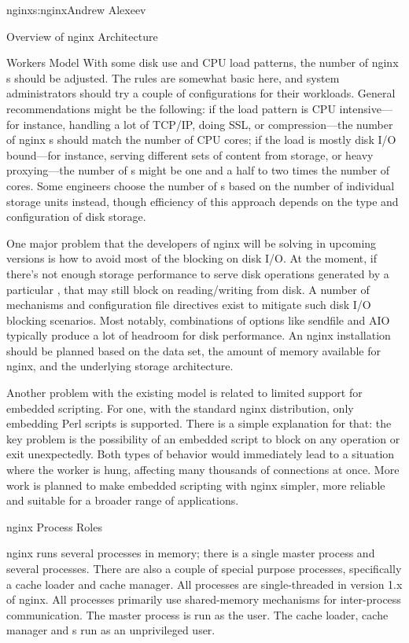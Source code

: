 \begin{aosachapter}{nginx}{s:nginx}{Andrew Alexeev}
\begin{aosasect1}{Overview of nginx Architecture}
\begin{aosasect2}{Workers Model}
With some disk use and CPU load patterns, the number of nginx
s should be adjusted. The rules are somewhat basic here,
and system administrators should try a couple of configurations for
their workloads. General recommendations might be the following: if
the load pattern is CPU intensive---for instance, handling a lot of
TCP/IP, doing SSL, or compression---the number of nginx s
should match the number of CPU cores; if the load is mostly disk I/O
bound---for instance, serving different sets of content from storage,
or heavy proxying---the number of s might be one and a half
to two times the number of cores. Some engineers choose the number of
s based on the number of individual storage units
instead, though efficiency of this approach depends on the type and
configuration of disk storage.

One major problem that the developers of nginx will be solving in upcoming
versions is how to avoid most of the blocking on disk I/O. At the moment, if
there's not enough storage performance to serve disk operations generated by a
particular , that  may still block on reading/writing
from disk. A number of mechanisms and configuration file directives exist to
mitigate such disk I/O blocking scenarios. Most notably, combinations of
options like sendfile and AIO typically produce a lot of headroom for disk
performance. An nginx installation should be planned based on the data set,
the amount of memory available for nginx, and the underlying storage architecture.

Another problem with the existing  model is related to
limited support for embedded scripting. For one, with the standard
nginx distribution, only embedding Perl scripts is supported. There is
a simple explanation for that: the key problem is the
possibility of an embedded script to block on any
operation or exit unexpectedly. Both types of behavior would
immediately lead to a situation where the worker is hung, affecting
many thousands of connections at once. More work is planned to make
embedded scripting with nginx simpler, more reliable and suitable for
a broader range of applications.

\end{aosasect2}

\begin{aosasect2}{nginx Process Roles}

nginx runs several processes in memory; there is a single master
process and several  processes. There are also a couple
of special purpose processes, specifically a cache loader and cache
manager. All processes are single-threaded in version 1.x of
nginx. All processes primarily use shared-memory mechanisms for
inter-process communication. The master process is run as the
 user. The cache loader, cache manager and s
run as an unprivileged user.


\end{aosasect2}
\end{aosasect1}
\end{aosachapter}
